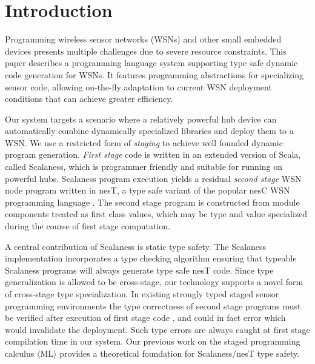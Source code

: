 \section{Introduction}

Programming wireless sensor networks (WSNs) and other small embedded devices presents multiple
challenges due to severe resource constraints. This paper describes a programming language
system supporting type safe dynamic code generation for WSNs. It features programming
abstractions for specializing sensor code, allowing on-the-fly adaptation to current WSN
deployment conditions that can achieve greater
efficiency. %

Our system targets a scenario where a relatively powerful hub device can automatically combine
dynamically specialized libraries and deploy them to a WSN. We use a restricted form of
\emph{staging} \cite{Taha-MetaML,DBLP:conf/icess/Taha04,289140} to achieve well founded dynamic
program generation. \emph{First stage} code is written in an extended version of Scala, called
Scalaness, which is programmer friendly and suitable for running on powerful hubs. Scalaness
program execution yields a residual \emph{second stage} WSN node program written in nesT, a type
safe variant of the popular nesC WSN programming language \cite{Gay-nesC-2003}. The second stage
program is constructed from module components treated as first class values, which may be type
and value specialized during the course of first stage computation.

A central contribution of Scalaness is static type safety. The Scalaness implementation
incorporates a type checking algorithm ensuring that typeable Scalaness programs will always
generate type safe nesT code. Since type generalization is allowed to be cross-stage, our
technology supports a novel form of cross-stage type specialization. In existing strongly typed
staged sensor programming environments the type correctness of second stage programs must be
verified after execution of first stage code \cite{Mainland-Flask-2008}, and could in fact error
which would invalidate the deployment. Such type errors are always caught at first stage
compilation time in our system. Our previous work on the staged programming calculus $\langle
\text{ML} \rangle$ \cite{FramedML} provides a theoretical foundation for Scalaness/nesT type
safety.

